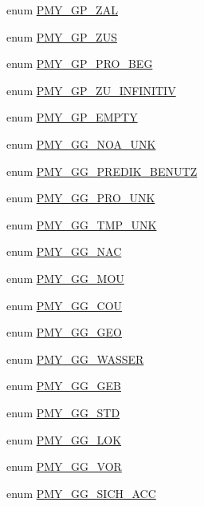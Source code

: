 \begin{DoxyCompactItemize}
\item 
enum \hyperlink{gramtab__consts_8php_ab1ba9b1472d3631b1f93f233f2229f31}{PMY\_\-GP\_\-ZAL} 
\item 
enum \hyperlink{gramtab__consts_8php_a0751e5c7e42a8884904d2cc01af2e72b}{PMY\_\-GP\_\-ZUS} 
\item 
enum \hyperlink{gramtab__consts_8php_a23f9ee250e5ffa47c7f561bfa9f85548}{PMY\_\-GP\_\-PRO\_\-BEG} 
\item 
enum \hyperlink{gramtab__consts_8php_a6946b1ef0848edad2150fcec5ec9d4e3}{PMY\_\-GP\_\-ZU\_\-INFINITIV} 
\item 
enum \hyperlink{gramtab__consts_8php_acb4030dfdcc5b14747ce913a564b7220}{PMY\_\-GP\_\-EMPTY} 
\item 
enum \hyperlink{gramtab__consts_8php_a7a4d1b73c5503941bd48c6580dba0ac6}{PMY\_\-GG\_\-NOA\_\-UNK} 
\item 
enum \hyperlink{gramtab__consts_8php_ae9bc90b3c611523e2d3997d2a57b135b}{PMY\_\-GG\_\-PREDIK\_\-BENUTZ} 
\item 
enum \hyperlink{gramtab__consts_8php_abe3c26c0093a8bf151d977ddc4213365}{PMY\_\-GG\_\-PRO\_\-UNK} 
\item 
enum \hyperlink{gramtab__consts_8php_ae10d579226c6d2f1a5720a78363958bf}{PMY\_\-GG\_\-TMP\_\-UNK} 
\item 
enum \hyperlink{gramtab__consts_8php_a1eb458f38d9e7292362d6cde61a9970e}{PMY\_\-GG\_\-NAC} 
\item 
enum \hyperlink{gramtab__consts_8php_a386ef9972807702eb9547b529d414b50}{PMY\_\-GG\_\-MOU} 
\item 
enum \hyperlink{gramtab__consts_8php_aabfda83ba1aae3ef3c371b1a11290313}{PMY\_\-GG\_\-COU} 
\item 
enum \hyperlink{gramtab__consts_8php_a764465576903f89c43e8d005a4138556}{PMY\_\-GG\_\-GEO} 
\item 
enum \hyperlink{gramtab__consts_8php_a57a8be98ba83c1af2392a9ab3ec4a3df}{PMY\_\-GG\_\-WASSER} 
\item 
enum \hyperlink{gramtab__consts_8php_a881470b702a5ab56ac6ab12d151b5de4}{PMY\_\-GG\_\-GEB} 
\item 
enum \hyperlink{gramtab__consts_8php_a44e4d8ac0504f4c6d412e4f8fa6534f7}{PMY\_\-GG\_\-STD} 
\item 
enum \hyperlink{gramtab__consts_8php_a3ac36e2768d502b84da7cb7a516a9721}{PMY\_\-GG\_\-LOK} 
\item 
enum \hyperlink{gramtab__consts_8php_a5e78c93c97818ed4d624343177558350}{PMY\_\-GG\_\-VOR} 
\item 
enum \hyperlink{gramtab__consts_8php_a12e57fb6bdf015ffeeddf260c76fb284}{PMY\_\-GG\_\-SICH\_\-ACC} 

\end{DoxyCompactItemize}
